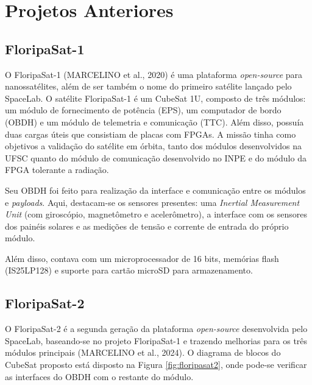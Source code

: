 
\section{Projetos Anteriores}

\subsection{FloripaSat-1}
O FloripaSat-1 (MARCELINO et al., 2020) é uma plataforma \textit{open-source} para nanossatélites, além de ser também o nome do primeiro satélite lançado pelo SpaceLab. O satélite FloripaSat-1 é um CubeSat 1U,  composto de três módulos: um módulo de fornecimento de potência (EPS), um computador de bordo (OBDH) e um módulo de telemetria e comunicação (TTC). Além disso, possuía duas cargas úteis que consistiam de placas com FPGAs. A missão tinha como objetivos a validação do satélite em órbita, tanto dos módulos desenvolvidos na UFSC quanto do módulo de comunicação desenvolvido no INPE e do módulo da FPGA tolerante a radiação.

Seu OBDH foi feito para realização da interface e comunicação entre os módulos e \textit{payloads}. Aqui, destacam-se os sensores presentes: uma \textit{Inertial Measurement Unit} (com giroscópio, magnetômetro e acelerômetro), a interface com os sensores dos painéis solares e as medições de tensão e corrente de entrada do próprio módulo.

Além disso, contava com um microprocessador de 16 bits, memórias flash (IS25LP128) e suporte para cartão microSD para armazenamento.

\subsection{FloripaSat-2}
O FloripaSat-2 é a segunda geração da plataforma \textit{open-source} desenvolvida pelo SpaceLab, baseando-se no projeto FloripaSat-1 e trazendo melhorias para os três módulos principais (MARCELINO et al., 2024). O diagrama de blocos do CubeSat proposto está disposto na Figura \ref{fig:floripasat2}, onde pode-se verificar as interfaces do OBDH com o restante do módulo.


